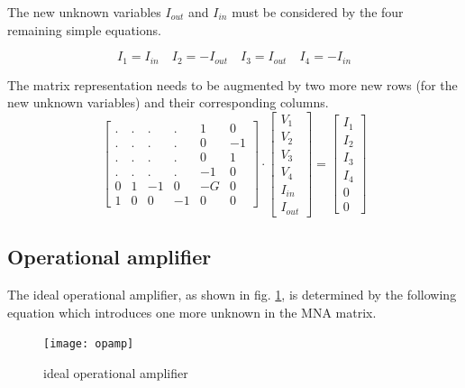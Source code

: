 The new unknown variables $I_{out}$ and $I_{in}$ must be considered by
the four remaining simple equations.

\begin{equation}
I_{1} = I_{in} \quad I_{2} = -I_{out} \quad I_{3} = I_{out} \quad I_{4} = -I_{in}
\end{equation}

The matrix representation needs to be augmented by two more new rows
(for the new unknown variables) and their corresponding columns.
\begin{equation}
\begin{bmatrix}
.&.&.&.& 1 & 0\\
.&.&.&.& 0 & -1\\
.&.&.&.& 0 & 1\\
.&.&.&.& -1 & 0\\
0 & 1 & -1 & 0 & -G & 0\\
1 & 0 & 0 & -1 & 0 & 0
\end{bmatrix}
\cdot
\begin{bmatrix}
V_{1}\\
V_{2}\\
V_{3}\\
V_{4}\\
I_{in}\\
I_{out}
\end{bmatrix}
=
\begin{bmatrix}
I_{1}\\
I_{2}\\
I_{3}\\
I_{4}\\
0\\
0
\end{bmatrix}
\end{equation}

\subsection{Operational amplifier}

The ideal operational amplifier, as shown in fig. \ref{fig:opamp}, is
determined by the following equation which introduces one more unknown
in the MNA matrix.

\begin{figure}[ht]
\begin{center}
\texttt{[image: opamp]}
\end{center}
\caption{ideal operational amplifier}
\label{fig:opamp}
\end{figure}
\FloatBarrier

